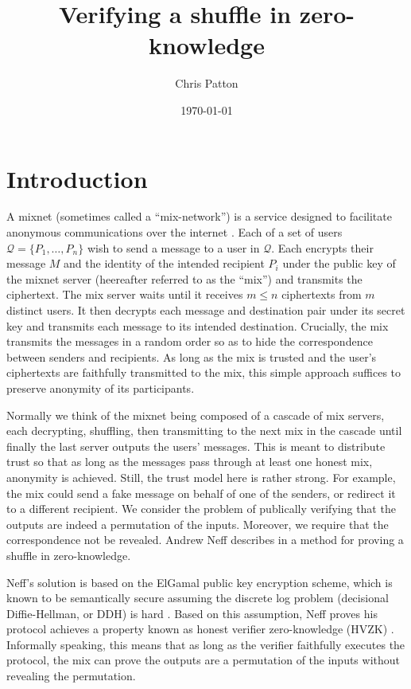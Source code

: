 \documentclass[letter]{article}
\date{\today}
\title{Verifying a shuffle in zero-knowledge}
\author{Chris Patton}
\renewcommand{\cal}[1]{\mathcal{#1}}
\begin{document}
  \maketitle

\section{Introduction}

A mixnet (sometimes called a ``mix-network'') is a service designed to
facilitate anonymous communications over the internet \cite{chaum81}. Each of a
set of users $\cal{Q} = \{P_1, \dots, P_n\}$ wish to send a message to a user in
$\cal{Q}$. Each encrypts their message $M$ and the identity of the intended
recipient $P_i$ under the public key of the mixnet server (heereafter referred
to as the ``mix'') and transmits the ciphertext.  The mix server waits until it
receives $m \le n$ ciphertexts from $m$ distinct users.  It then decrypts each
message and destination pair under its secret key and transmits each message to
its intended destination. Crucially, the mix transmits the messages in a random
order so as to hide the correspondence between senders and recipients.  As long
as the mix is trusted and the user's ciphertexts are faithfully transmitted to
the mix, this simple approach suffices to preserve anonymity of its
participants.

Normally we think of the mixnet being composed of a cascade of mix servers, each
decrypting, shuffling, then transmitting to the next mix in the cascade until
finally the last server outputs the users' messages. This is meant to distribute
trust so that as long as the messages pass through at least one honest mix,
anonymity is achieved. Still, the trust model here is rather strong. For
example, the mix could send a fake message on behalf of one of the senders, or
redirect it to a different recipient.  We consider the problem of publically
verifying that the outputs are indeed a permutation of the inputs. Moreover, we
require that the correspondence not be revealed. Andrew Neff describes in
\cite{neff01} a method for proving a shuffle in zero-knowledge.

Neff's solution is based on the ElGamal public key encryption scheme, which is
known to be semantically secure assuming the discrete log problem (decisional
Diffie-Hellman, or DDH) is hard \cite{elgamal84}. Based on this assumption, Neff
proves his protocol achieves a property known as honest verifier zero-knowledge
(HVZK) \cite{goldreich}. Informally speaking, this means that as long as the verifier
faithfully executes the protocol, the mix can prove the outputs are a
permutation of the inputs without revealing the permutation.
\end{document}
